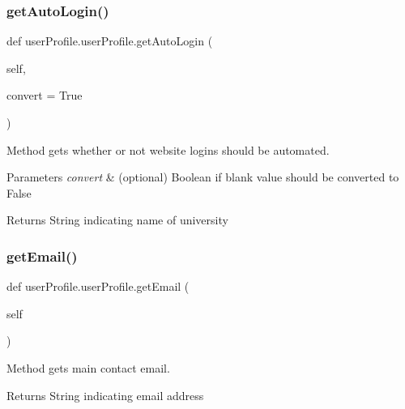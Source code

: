 \subsubsection{\texorpdfstring{get\+Auto\+Login()}{getAutoLogin()}}
{\footnotesize\ttfamily def user\+Profile.\+user\+Profile.\+get\+Auto\+Login (\begin{DoxyParamCaption}\item[{}]{self,  }\item[{}]{convert = {\ttfamily True} }\end{DoxyParamCaption})}



Method gets whether or not website logins should be automated. 


\begin{DoxyParams}{Parameters}
{\em convert} & (optional) Boolean if blank value should be converted to False \\
\hline
\end{DoxyParams}
\begin{DoxyReturn}{Returns}
String indicating name of university 
\end{DoxyReturn}
\mbox{\label{classuserProfile_1_1userProfile_a31aed4505464a0f546e0bb33306a355d}} 
\subsubsection{\texorpdfstring{get\+Email()}{getEmail()}}
{\footnotesize\ttfamily def user\+Profile.\+user\+Profile.\+get\+Email (\begin{DoxyParamCaption}\item[{}]{self }\end{DoxyParamCaption})}



Method gets main contact email. 

\begin{DoxyReturn}{Returns}
String indicating email address 
\end{DoxyReturn}
\mbox{\label{classuserProfile_1_1userProfile_a3b66b43cf824415acf3c18dfb71ae226}} 
